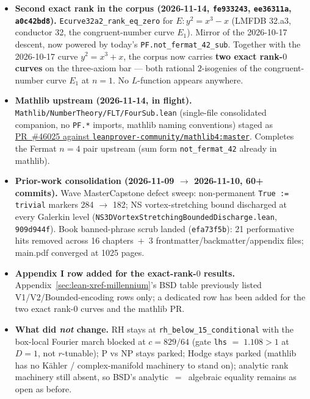 \begin{itemize}
\item \textbf{Second exact rank in the corpus (2026-11-14,
\texttt{fe933243}, \texttt{ee36311a}, \texttt{a0c42bd8}).}
\texttt{Ecurve32a2\_rank\_eq\_zero} for $E : y^2 = x^3 - x$ (LMFDB
32.a3, conductor 32, the congruent-number curve $E_1$).  Mirror of the
2026-10-17 descent, now powered by today's
\texttt{PF.not\_fermat\_42\_sub}.  Together with the 2026-10-17 curve $y^2 = x^3 + x$, the
corpus now carries \textbf{two exact rank-$0$ curves} on the
three-axiom bar --- both rational $2$-isogenies of the
congruent-number curve $E_1$ at $n = 1$.  No $L$-function appears
anywhere.

\item \textbf{Mathlib upstream (2026-11-14, in flight).}
\texttt{Mathlib/NumberTheory/FLT/FourSub.lean} (single-file consolidated
companion, no \texttt{PF.*} imports, mathlib naming conventions) staged
as
\href{https://github.com/leanprover-community/mathlib4/pull/46025}
{PR~\#46025 against \texttt{leanprover-community/mathlib4:master}}.
Completes the Fermat $n = 4$ pair upstream (sum form
\texttt{not\_fermat\_42} already in mathlib).

\item \textbf{Prior-work consolidation (2026-11-09 $\to$ 2026-11-10,
60+ commits).}  Wave MasterCapstone defect sweep: non-permanent
\texttt{True := trivial} markers 284 $\to$ 182; NS vortex-stretching
bound discharged at every Galerkin level
(\texttt{NS3DVortexStretchingBoundedDischarge.lean}, \texttt{909d944f}).
Book banned-phrase scrub landed (\texttt{efa73f5b}): 21 performative
hits removed across 16 chapters~$+$~3 frontmatter/backmatter/appendix
files; main.pdf converged at 1025 pages.

\item \textbf{Appendix I row added for the exact-rank-$0$ results.}
Appendix~\ref{sec:lean-xref-millennium}'s BSD table previously listed
V1/V2/Bounded-encoding rows only; a dedicated row has been added for
the two exact rank-$0$ curves and the mathlib PR.

\item \textbf{What did \emph{not} change.}  RH stays at
\texttt{rh\_below\_15\_conditional} with the box-local Fourier march
blocked at $c = 829/64$ (gate \texttt{lhs} $=\;1.108 > 1$ at $D = 1$,
not $r$-tunable); P vs NP stays parked; Hodge stays parked (mathlib
has no K\"ahler / complex-manifold machinery to stand on); analytic
rank machinery still absent, so BSD's analytic~$=$~algebraic equality
remains as open as before.

\end{itemize}

